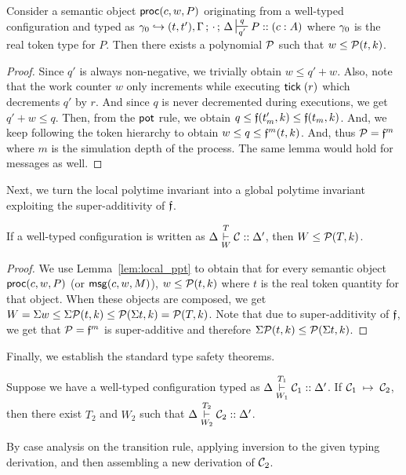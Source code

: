 \begin{lemma}\label{lem:local_ppt}
  Consider a semantic object $\mathsf{proc}(c, w, P)$ originating from a well-typed configuration and
  typed as $\K_0 \hookrightarrow (t, t'), \Tokens \semi \cdot \semi \D \entailpot{q}{q'} P :: (c : A)$
  where $\gamma_0$ is the real token type for $P$.
  Then there exists a polynomial $\mathcal{P}$ such that $w \leq \mathcal{P}(t, k)$.
\end{lemma}

\begin{proof}
  Since $q'$ is always non-negative, we trivially obtain $w \leq q'+w$.
  Also, note that the work counter $w$ only increments while executing $\mathsf{tick} \; (r)$
  which decrements $q'$ by $r$.
  And since $q$ is never decremented during executions, we get $q'+w \leq q$.
  Then, from the $\mathsf{pot}$ rule, we obtain $q \leq \mathfrak{f}(t_m', k) \leq \mathfrak{f}(t_m, k)$.
  And, we keep following the token hierarchy to obtain
  $w \leq q \leq \mathfrak{f}^{m}(t, k)$.
  And, thus $\mathcal{P} = \mathfrak{f}^{m}$ where $m$ is the simulation depth of the process.
  The same lemma would hold for messages as well.
\end{proof}

Next, we turn the local polytime invariant into a global polytime invariant exploiting
the super-additivity of $\mathfrak{f}$.

\begin{theorem} \label{thm:global_ppt}
  If a well-typed configuration is written as $\Delta \overset{T}{\underset{W}{\vdash}} \mathcal{C} :: \Delta'$,
  then $W \leq \mathcal{P}(T, k)$.
\end{theorem}

\begin{proof}
  We use Lemma~\ref{lem:local_ppt} to obtain that for every semantic object $\mathsf{proc}(c, w, P)$ (or $\mathsf{msg}(c, w, M)$),
  $w \leq \mathcal{P}(t, k)$ where $t$ is the real token quantity for that object.
  When these objects are composed, we get $W = \Sigma w \leq \Sigma \mathcal{P}(t, k) \leq
  \mathcal{P}(\Sigma t, k) = \mathcal{P}(T, k)$.
  Note that due to super-additivity of $\mathfrak{f}$, we get that $\mathcal{P} = \mathfrak{f}^m$ is super-additive
  and therefore $\Sigma \mathcal{P}(t, k) \leq \mathcal{P}(\Sigma t, k)$.
\end{proof}

Finally, we establish the standard type safety theorems.

\begin{theorem}
\label{thm:preservation}
Suppose we have a well-typed configuration typed as
$\Delta \overset{T_1}{\underset{W_1}{\vdash}} \mathcal{C}_1 :: \Delta'$.
If $\mathcal{C}_1 \; \mapsto \; \mathcal{C}_2$, then there exist $T_2$ and $W_2$ such
that $\Delta \overset{T_2}{\underset{W_2}{\vdash}} \mathcal{C}_2 :: \Delta'$.
\end{theorem}
\begin{proofsketch}
  By case analysis on the transition rule, applying inversion to the
  given typing derivation, and then assembling a new derivation of
  $\mathcal{C}_2$.
\end{proofsketch}

